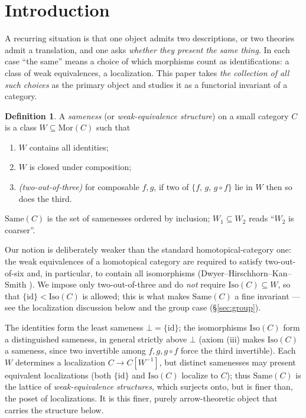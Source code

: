 \documentclass[11pt]{amsart}
\theoremstyle{definition}
\newtheorem{defi}[thm]{Definition}
\newcommand{\Same}{\mathrm{Same}}
\newcommand{\Mor}{\mathrm{Mor}}
\newcommand{\Iso}{\mathrm{Iso}}
\begin{document}
\maketitle

\section{Introduction}

A recurring situation is that one object admits two descriptions, or two
theories admit a translation, and one asks \emph{whether they present the same
thing}. In each case ``the same'' means a choice of which morphisms count as
identifications: a class of weak equivalences, a localization. This paper takes
\emph{the collection of all such choices} as the primary object and studies it
as a functorial invariant of a category.

\begin{defi}\label{def:sameness}
A \emph{sameness} (or \emph{weak-equivalence structure}) on a small category $C$
is a class $W\subseteq\Mor(C)$ such that
\begin{enumerate}
\item[(i)] $W$ contains all identities;
\item[(ii)] $W$ is closed under composition;
\item[(iii)] \emph{(two-out-of-three)} for composable $f,g$, if two of
$\{f,\,g,\,g\circ f\}$ lie in $W$ then so does the third.
\end{enumerate}
$\Same(C)$ is the set of samenesses ordered by inclusion; $W_1\subseteq W_2$
reads ``$W_2$ is coarser''.
\end{defi}

Our notion is deliberately weaker than the standard homotopical-category one: the
weak equivalences of a homotopical category are required to satisfy two-out-of-six
and, in particular, to contain all isomorphisms (Dwyer--Hirschhorn--Kan--Smith
\cite{DHKS}). We impose only two-out-of-three and do \emph{not} require
$\Iso(C)\subseteq W$, so that $\{\mathrm{id}\}<\Iso(C)$ is allowed; this is what
makes $\Same(C)$ a fine invariant --- see the localization discussion below and
the group case (\S\ref{sec:group}).

The identities form the least sameness $\bot=\{\mathrm{id}\}$; the isomorphisms
$\Iso(C)$ form a distinguished sameness, in general strictly above $\bot$
(axiom (iii) makes $\Iso(C)$ a sameness, since two invertible among
$f,g,g\circ f$ force the third invertible). Each $W$ determines a localization
$C\to C[W^{-1}]$, but distinct samenesses may present equivalent localizations
(both $\{\mathrm{id}\}$ and $\Iso(C)$ localize to $C$); thus $\Same(C)$ is the
lattice of \emph{weak-equivalence structures}, which surjects onto, but is finer
than, the poset of localizations. It is this finer, purely arrow-theoretic
object that carries the structure below.
\end{document}
